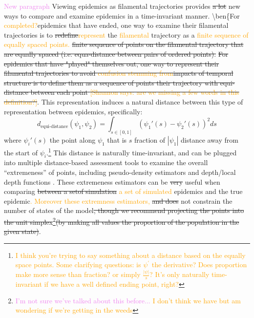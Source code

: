 \documentclass[
  shortnames]{jss}
\begin{document}
\textcolor{violet}{New paragraph} Viewing epidemics as filamental
trajectories provides \sout{a lot }new ways to compare and examine
epidemics in a time-invariant manner. \textbackslash ben\{For
\textcolor{orange}{completed?}epidemics that have ended, one way to
examine their filamental trajectories is to
\sout{redefine}\textcolor{orange}{represent} the
\textcolor{orange}{filamental} trajectory as a
\textcolor{orange}{finite sequence of equally spaced points.}
\sout{finite sequence of points on the filamental trajectory that are equally spaced (i.e. equa-distance between pairs of ordered points).}
\sout{For epidemics that have "played" themselves out, one way to represent their filamental trajectories to avoid \textcolor{orange}{confusion stemming from}\sout{impacts of} temporal structure is to define them as a sequence of points their trajectory with equi-distance between each point \textcolor{orange}{[Shannon says: are we missing a few words in this definition?]}}.
This representation induces a natural distance between this type of
representation between epidemics, specifically: \[
d_\text{equi-distance}(\psi_1, \psi_2)  = \int_{s \in [0,1]} (\psi_1'(s) - \psi_2'(s))^2 ds
\] where \(\psi_i'(s)\) the point along \(\psi_1\) that is \(s\)
fraction of \(|\psi_1|\) distance away from the start of
\(\psi_i\).\footnote{\textcolor{orange}{I think you're trying to say something about a distance based on the equally space points.  Some clarifying questions:  is $\psi^\prime$ the derivative?  Does proportion make more sense than fraction? or simply $\frac{|\psi|}{s}$? It's only naturally time-invariant if we have a well defined ending point, right?}}
This distance is naturally time-invariant, and can be plugged into
multiple distance-based assessment tools to examine the overall
``extremeness'' of points, including pseudo-density estimators and
depth/local depth functions
\citep[for examples see][]{Ciollaro2016, Geenens2017}. These extremeness
estimators can be \sout{very} useful when comparing
\sout{between a setof simulation} \textcolor{orange}{a set of simulated}
epidemics and the true
epidemic\textcolor{orange}{. Moreover these extremness estimators,}
\sout{and does} \textcolor{orange}{} not constrain the number of states
of the
model\sout{, though we recommend projecting the points into the unit simplex}\footnote{\textcolor{violet}{I'm not sure we've talked about this before... \textcolor{orange}{I don't think we have but am wondering if we're getting in the weeds}}}\sout{(by making all values the proportion of the population in the given state)}.
\end{document}
